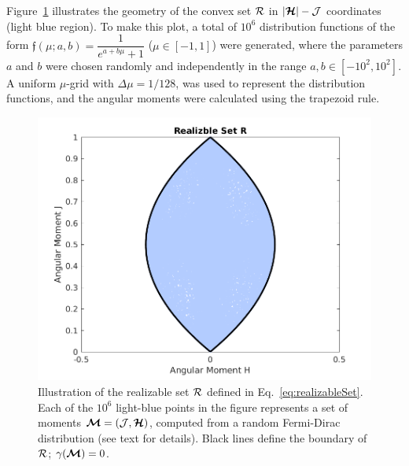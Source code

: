Figure~\ref{fig:RealizableSetFermionic} illustrates the geometry of the convex set $\mathcal{R}$ in $|\boldsymbol{\mathcal{H}}| - \mathcal{J}$ coordinates (light blue region).
To make this plot, a total of $10^{6}$ distribution functions of the form $\mathfrak{f}(\mu;a,b) = \dfrac{1}{e^{a+b\mu}+1}$ ($\mu\in[-1,1]$) were generated, where the parameters $a$ and $b$ were chosen randomly and independently in the range $a,b\in[-10^{2},10^{2}]$.  
A uniform $\mu$-grid with $\Delta\mu=1/128$, was used to represent the distribution functions, and the angular moments were calculated using the trapezoid rule.  
\begin{figure}
  \centering
  \includegraphics[width=1.0\linewidth]{figures/RealizableSetFermionic}
  \caption{Illustration of the realizable set $\mathcal{R}$ defined in Eq.~\eqref{eq:realizableSet}.  
  Each of the $10^{6}$ light-blue points in the figure represents a set of moments $\boldsymbol{\mathcal{M}}=(\mathcal{J},\boldsymbol{\mathcal{H}})$, computed from a random Fermi-Dirac distribution (see text for details).  
  Black lines define the boundary of $\mathcal{R}$; $\gamma(\boldsymbol{\mathcal{M}}) = 0$.}
  \label{fig:RealizableSetFermionic}
\end{figure}

